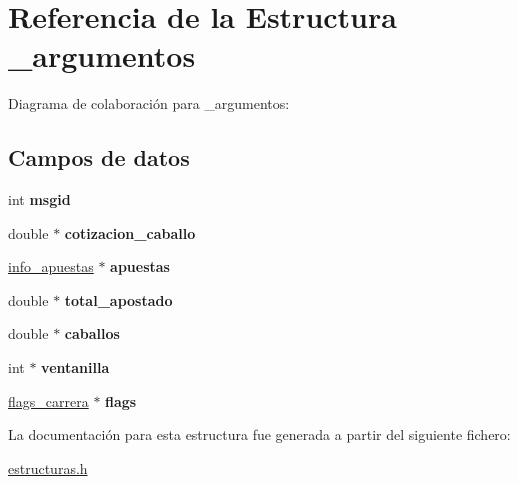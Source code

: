 \hypertarget{struct__argumentos}{}\section{Referencia de la Estructura \+\_\+argumentos}
\label{struct__argumentos}


Diagrama de colaboración para \+\_\+argumentos\+:
\subsection*{Campos de datos}
\begin{DoxyCompactItemize}
\item 
\mbox{\label{struct__argumentos_a226942ae71202889b95d19fcafc2dd92}} 
int {\bfseries msgid}
\item 
\mbox{\label{struct__argumentos_ad44607bff3b6a0eeb7730326d2ae4a75}} 
double $\ast$ {\bfseries cotizacion\+\_\+caballo}
\item 
\mbox{\label{struct__argumentos_aadbd4ef74b43ac1d8c09c2df8008d498}} 
\hyperlink{structinfo__apuestas}{info\+\_\+apuestas} $\ast$ {\bfseries apuestas}
\item 
\mbox{\label{struct__argumentos_a7a5be8b9d2c958cee414fd26d0dea5bd}} 
double $\ast$ {\bfseries total\+\_\+apostado}
\item 
\mbox{\label{struct__argumentos_a2008b11897405d2ff4fe6032f2d19542}} 
double $\ast$ {\bfseries caballos}
\item 
\mbox{\label{struct__argumentos_af18708d8ebc5d924cee63e6fe00615e6}} 
int $\ast$ {\bfseries ventanilla}
\item 
\mbox{\label{struct__argumentos_aefd153a2fbfe695fa2edcdaf8cf7a002}} 
\hyperlink{structflags__carrera}{flags\+\_\+carrera} $\ast$ {\bfseries flags}
\end{DoxyCompactItemize}


La documentación para esta estructura fue generada a partir del siguiente fichero\+:\begin{DoxyCompactItemize}
\item 
\hyperlink{estructuras_8h}{estructuras.\+h}\end{DoxyCompactItemize}
